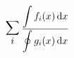 \newcommand\D{\displaystyle}
\[  \mathop{\text{\Large$\D\sum_i$}}
  \dfrac{\D\int f_i(x)\,\mathrm{d}x}
    {\D\oint g_i(x)\,\mathrm{d}x}  \]
